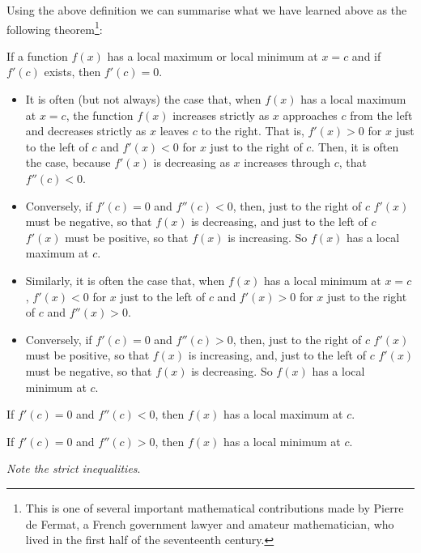 Using the above definition we can summarise what we have learned above
as the following theorem\footnote{This is one of several important
mathematical contributions made by Pierre de Fermat, a French government
lawyer and amateur mathematician, who lived in the first half of
the seventeenth century. }:
\begin{theorem}\label{thm:APPlocalMaxMin}
If a function $f(x)$ has a local maximum or local minimum at $x=c$
and if $f'(c)$ exists, then $f'(c)=0$.
\end{theorem}

\begin{itemize}
\item
It is often (but not always) the case that, when $f(x)$ has a local maximum
at $x=c$, the function $f(x)$ increases strictly as $x$ approaches $c$ from the
left and decreases strictly as $x$ leaves $c$ to the right. That is,
$f'(x)>0$ for $x$ just to the left of $c$ and $f'(x)<0$ for $x$ just
to the right of $c$.
Then, it is often the case, because $f'(x)$ is decreasing as $x$ increases through $c$, that $f''(c)<0$.

\item
Conversely, if $f'(c)=0$ and $f''(c)<0$,
  then, just to the right of $c$ $f'(x)$ must be negative, so that
  $f(x)$ is decreasing, and  just to the left of $c$ $f'(x)$ must
  be positive, so that $f(x)$ is increasing.
  So $f(x)$ has a local maximum at $c$.

\item
 Similarly, it is often the case that, when $f(x)$ has a local minimum
 at $x=c$, $f'(x)<0$ for $x$ just to the left of $c$ and $f'(x)>0$ for
 $x$ just to the right of $c$ and $f''(x)>0$.

\item
Conversely, if $f'(c)=0$ and $f''(c)>0$,
  then, just to the right of $c$ $f'(x)$ must be positive, so that
  $f(x)$ is increasing, and, just to the left of $c$ $f'(x)$ must be
  negative, so that $f(x)$ is decreasing.
  So $f(x)$ has a local minimum at $c$.

\end{itemize}


\begin{theorem}\label{thm:APPsecondDerivTest}
If $f'(c)=0$ and $f''(c) <0$, then $f(x)$ has a local maximum at $c$.

If $f'(c)=0$ and $f''(c) >0$, then $f(x)$ has a local minimum at $c$.

\emph{Note the strict inequalities}.

\end{theorem}



